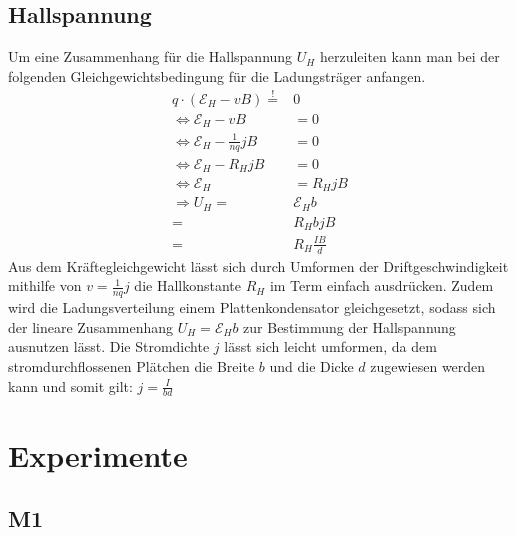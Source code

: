 \subsection{Hallspannung}
Um eine Zusammenhang für die Hallspannung \(U_H\) herzuleiten kann man bei der folgenden Gleichgewichtsbedingung für die Ladungsträger anfangen. 
\begin{align*}
q\cdot(\mathcal{E}_H-v B) \stackrel{!}{=} & 0 \\
\Leftrightarrow \mathcal{E}_H-v B  & =0\\
\Leftrightarrow \mathcal{E}_H- \frac{1}{n q}j B  &=0 \\
\Leftrightarrow \mathcal{E}_H- R_H j B  &=0 \\
\Leftrightarrow \mathcal{E}_H &=  R_H j B \\
\Rightarrow U_H =& \mathcal{E}_H b \\
=& R_H b j B \\
=& R_H \frac{I B}{d}
\end{align*}
Aus dem Kräftegleichgewicht lässt sich durch Umformen der Driftgeschwindigkeit mithilfe von  \(v=\frac{1}{n q}j\) die Hallkonstante \(R_H\) im Term einfach ausdrücken. Zudem wird die Ladungsverteilung einem Plattenkondensator gleichgesetzt, sodass sich der lineare Zusammenhang \(U_H = \mathcal{E}_H b \) zur Bestimmung der Hallspannung ausnutzen lässt. Die Stromdichte \(j\) lässt sich leicht umformen, da dem stromdurchflossenen Plätchen die Breite \(b\) und die Dicke \(d\) zugewiesen werden kann und somit gilt: \(j=\frac{I}{b d}\)


\section{Experimente}
\subsection{M1}


